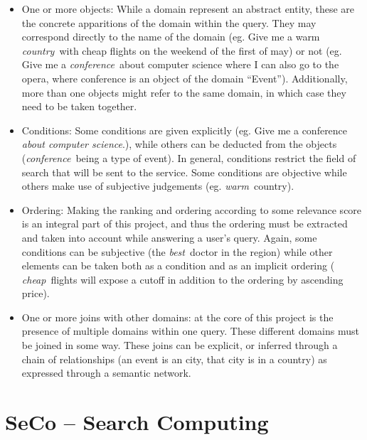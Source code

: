 \begin{itemize}

  \item One or more objects: While a domain represent an abstract entity, these are the concrete apparitions of the domain within the query. They may correspond directly to the name of the domain (eg. Give me a warm \emph{country}\ with cheap flights on the weekend of the first of may) or not (eg. Give me a \emph{conference}\ about computer science where I can also go to the opera, where conference is an object of the domain ``Event''). Additionally, more than one objects might refer to the same domain, in which case they need to be taken together.

  \item Conditions: Some conditions are given explicitly (eg. Give me a conference \emph{about computer science}.), while others can be deducted from the objects (\emph{conference}\ being a type of event). In general, conditions restrict the field of search that will be sent to the service. Some conditions are objective while others make use of subjective judgements (eg. \emph{warm}\ country).

  \item Ordering: Making the ranking and ordering according to some relevance score is an integral part of this project, and thus the ordering must be extracted and taken into account while answering a user's query. Again, some conditions can be subjective (the \emph{best}\ doctor in the region) while other elements can be taken both as a condition and as an implicit ordering ( \emph{cheap}\ flights will expose a cutoff in addition to the ordering by ascending price).

  \item One or more joins with other domains: at the core of this project is the presence of multiple domains within one query. These different domains must be joined in some way. These joins can be explicit, or inferred through a chain of relationships (an event is an city, that city is in a country) as expressed through a semantic network.

\end{itemize}





\section{SeCo -- Search Computing} %
\label{sec:seco}

